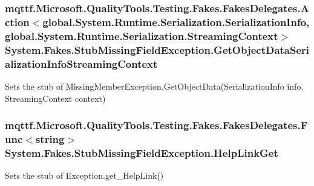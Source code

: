 \hypertarget{class_system_1_1_fakes_1_1_stub_missing_field_exception_ae1e6abf25d780d4652b4bf8a6bd44a55}{
\subsubsection[{Get\-Object\-Data\-Serialization\-Info\-Streaming\-Context}]{\setlength{\rightskip}{0pt plus 5cm}mqttf.\-Microsoft.\-Quality\-Tools.\-Testing.\-Fakes.\-Fakes\-Delegates.\-Action$<$global.\-System.\-Runtime.\-Serialization.\-Serialization\-Info, global.\-System.\-Runtime.\-Serialization.\-Streaming\-Context$>$ System.\-Fakes.\-Stub\-Missing\-Field\-Exception.\-Get\-Object\-Data\-Serialization\-Info\-Streaming\-Context}}\label{class_system_1_1_fakes_1_1_stub_missing_field_exception_ae1e6abf25d780d4652b4bf8a6bd44a55}


Sets the stub of Missing\-Member\-Exception.\-Get\-Object\-Data(\-Serialization\-Info info, Streaming\-Context context)

\hypertarget{class_system_1_1_fakes_1_1_stub_missing_field_exception_ad2ef46a3e09b22ec2258d392a5a4506c}{
\subsubsection[{Help\-Link\-Get}]{\setlength{\rightskip}{0pt plus 5cm}mqttf.\-Microsoft.\-Quality\-Tools.\-Testing.\-Fakes.\-Fakes\-Delegates.\-Func$<$string$>$ System.\-Fakes.\-Stub\-Missing\-Field\-Exception.\-Help\-Link\-Get}}\label{class_system_1_1_fakes_1_1_stub_missing_field_exception_ad2ef46a3e09b22ec2258d392a5a4506c}


Sets the stub of Exception.\-get\-\_\-\-Help\-Link()


